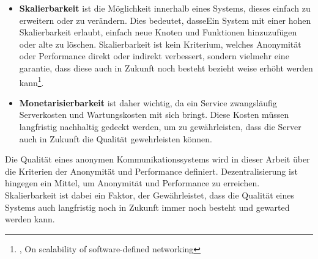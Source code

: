 \begin{itemize}
\item \textbf{Skalierbarkeit} ist die Möglichkeit innerhalb eines Systems, dieses einfach zu erweitern oder zu verändern. Dies bedeutet, dasseEin System mit einer hohen Skalierbarkeit erlaubt, einfach neue Knoten und Funktionen hinzuzufügen oder alte zu löschen. Skalierbarkeit ist kein Kriterium, welches Anonymität oder Performance direkt oder indirekt verbessert, sondern vielmehr eine garantie, dass diese auch in Zukunft noch besteht bezieht weise erhöht werden kann\footnote{\cite{ScalabilityOfNetworking}, On scalability of software-defined networking}.

\item \textbf{Monetarisierbarkeit} ist daher wichtig, da ein Service zwangsläufig Serverkosten und Wartungskosten mit sich bringt. Diese Kosten müssen langfristig nachhaltig gedeckt werden, um zu gewährleisten, dass die Server auch in Zukunft die Qualität gewehrleisten können.

\end{itemize}

Die Qualität eines anonymen Kommunikationssystems wird in dieser Arbeit über die Kriterien der Anonymität und Performance definiert. Dezentralisierung ist hingegen ein Mittel, um Anonymität und Performance zu erreichen. Skalierbarkeit ist dabei ein Faktor, der Gewährleistet, dass die Qualität eines Systems auch langfristig noch in Zukunft immer noch besteht und gewarted werden kann.